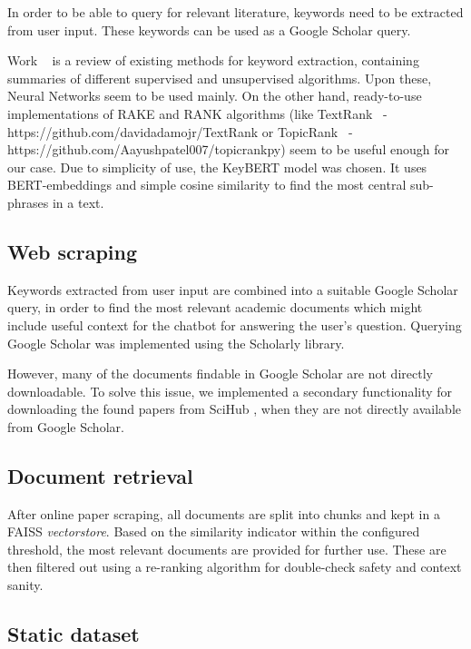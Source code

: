 \documentclass[fleqn,moreauthors,10pt]{ds_report}
\begin{document}
In order to be able to query for relevant literature, keywords need to be extracted from user input. These keywords can be used as a Google Scholar query.

Work ~\cite{siddiqi2015keyword} is a review of existing methods for keyword extraction, containing summaries of different supervised and unsupervised algorithms. Upon these, Neural Networks seem to be used mainly. On the other hand, ready-to-use implementations of RAKE and RANK algorithms (like TextRank~\cite{textrank} - https://github.com/davidadamojr/TextRank or TopicRank~\cite{bougouin2013topicrank} - https://github.com/Aayushpatel007/topicrankpy) seem to be useful enough for our case. Due to simplicity of use, the KeyBERT model \cite{grootendorst2020keybert} was chosen. It uses BERT-embeddings and simple cosine similarity to find the most central sub-phrases in a text.

\subsection*{Web scraping}

Keywords extracted from user input are combined into a suitable Google Scholar query, in order to find the most relevant academic documents which might include useful context for the chatbot for answering the user's question. Querying Google Scholar was implemented using the Scholarly \cite{cholewiak2021scholarly} library.

However, many of the documents findable in Google Scholar are not directly downloadable. To solve this issue, we implemented a secondary functionality for downloading the found papers from SciHub \cite{scihub}, when they are not directly available from Google Scholar. 

\subsection*{Document retrieval}

After online paper scraping, all documents are split into chunks and kept in a FAISS \textit{vectorstore}. Based on the similarity indicator within the configured threshold, the most relevant documents are provided for further use. These are then filtered out using a re-ranking algorithm for double-check safety and context sanity.

\subsection*{Static dataset}
\end{document}
